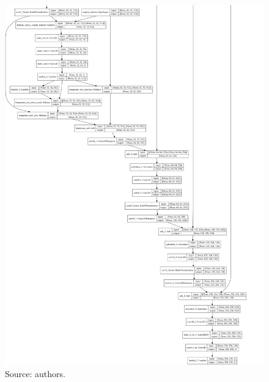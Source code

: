 \documentclass[12pt,openright,oneside,a4paper,english, brazilian]{abntex2}
\begin{document}
\begin{otherlanguage}{english}
\begin{apendicesenv}
\begin{figure}[!htb]
\includegraphics[width=\textwidth,height=\textheight,keepaspectratio]{model_plot/Stateful2}
Source: authors.
\label{stateful_plot_2}
\end{figure}
\clearpage
\newpage

\end{apendicesenv}
\end{otherlanguage}
\end{document}
